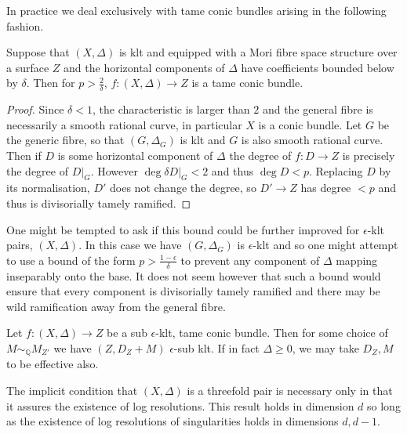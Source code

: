In practice we deal exclusively with tame conic bundles arising in the following fashion.

\begin{lemma}\label{S2}
	Suppose that $(X,\Delta)$ is klt and equipped with a Mori fibre space structure over a surface $Z$ and the horizontal components of $\Delta$ have coefficients bounded below by $\delta$. Then for $p > \frac{2}{\delta}$, $f\colon (X,\Delta) \to Z$ is a tame conic bundle.
\end{lemma}
\begin{proof}
	
	Since $\delta <1$, the characteristic is larger than $2$ and the general fibre is necessarily a smooth rational curve, in particular $X$ is a conic bundle. Let $G$ be the generic fibre, so that $(G,\Delta_{G})$ is klt and $G$ is also smooth rational curve. Then if $D$ is some horizontal component of $\Delta$ the degree of $f\colon D \to Z$ is precisely the degree of $D|_{G}$. However $\deg \delta D|_{G} <2$ and thus $\deg D < p$. Replacing $D$ by its normalisation, $D'$ does not change the degree, so $D'\to Z$ has degree $<p$ and thus is divisorially tamely ramified.
\end{proof}

\begin{remark}
	One might be tempted to ask if this bound could be further improved for $\epsilon$-klt pairs, $(X,\Delta)$. In this case we have $(G,\Delta_{G})$ is $\epsilon$-klt and so one might attempt to use a bound of the form $p > \frac{1-\epsilon}{\delta}$ to prevent any component of $\Delta$ mapping inseparably onto the base. It does not seem however that such a bound would ensure that every component is divisorially tamely ramified and there may be wild ramification away from the general fibre. 
\end{remark}

\begin{theorem}\label{cbf}
	Let $f\colon (X,\Delta) \to Z$ be a sub $\epsilon$-klt, tame conic bundle. Then for some choice of $M\sim_{\mathbb{Q}} M_{Z'}$ we have $(Z,D_{Z}+M)$ $\epsilon$-sub klt. If in fact $\Delta \geq 0$, we may take $D_{Z},M$ to be effective also.
\end{theorem}
\begin{remark}
	The implicit condition that $(X,\Delta)$ is a threefold pair is necessary only in that it assures the existence of log resolutions. This result holds in dimension $d$ so long as the existence of log resolutions of singularities holds in dimensions $d,d-1$.
\end{remark}

